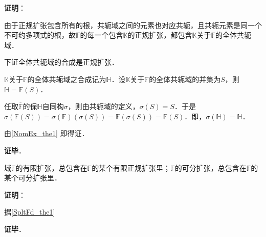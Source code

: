 \textbf{证明}：

由于正规扩张包含所有的根，共轭域之间的元素也对应共轭，且共轭元素是同一个不可约多项式的根，故$\mathbb{F}$的每一个包含$\mathbb{K}$的正规扩张，都包含$\mathbb{K}$关于$\mathbb{F}$的全体共轭域．

下证全体共轭域的合成是正规扩张．

$\mathbb{K}$关于$\mathbb{F}$的全体共轭域之合成记为$\mathbb{H}$．设$\mathbb{K}$关于$\mathbb{F}$的全体共轭域的并集为$S$，则$\mathbb{H}=\mathbb{F}(S)$．

任取$\overline{\mathbb{F}}$的保$\mathbb{H}$自同构$\sigma$，则由共轭域的定义，$\sigma(S)=S$．于是$\sigma(\mathbb{F}(S))=\sigma(\mathbb{F})(\sigma(S))=\mathbb{F}(\sigma(S))=\mathbb{F}(S)$．即，$\sigma(\mathbb{H})=\mathbb{H}$．

由\autoref{NomEx_the1} 即得证．

\textbf{证毕}．


\begin{theorem}{}
域$\mathbb{F}$的有限扩张，总包含在$\mathbb{F}$的某个有限正规扩张里；$\mathbb{F}$的可分扩张，总包含在$\mathbb{F}$的某个可分扩张里．
\end{theorem}

\textbf{证明}：

据\autoref{SpltFd_the1}~

\textbf{证毕}．













